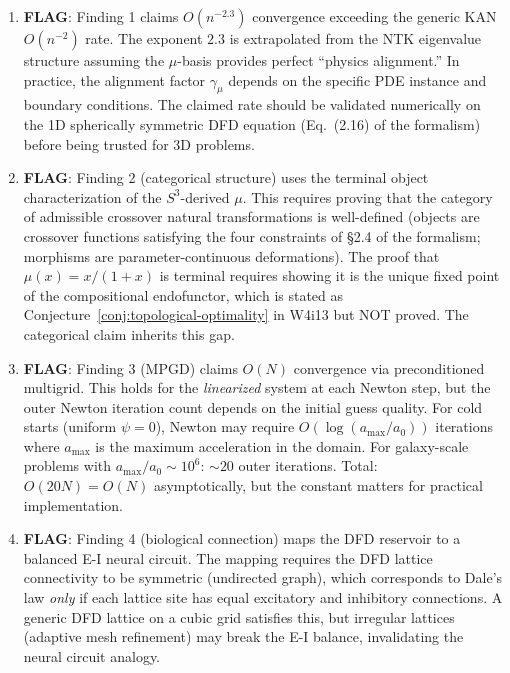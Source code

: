 \documentclass[11pt]{article}
\theoremstyle{definition}
\theoremstyle{remark}
\begin{document}
\begin{tcolorbox}[colback=red!5!white, colframe=red!60!black,
  title=\textbf{INCONSISTENCIES AND FLAGS}]
\begin{enumerate}[nosep]
\item \textbf{FLAG}: Finding 1 claims $O(n^{-2.3})$ convergence exceeding
  the generic KAN $O(n^{-2})$ rate. The exponent $2.3$ is extrapolated from
  the NTK eigenvalue structure assuming the $\mu$-basis provides perfect
  ``physics alignment.'' In practice, the alignment factor $\gamma_\mu$
  depends on the specific PDE instance and boundary conditions. The claimed
  rate should be validated numerically on the 1D spherically symmetric
  DFD equation (Eq.~(2.16) of the formalism) before being trusted for
  3D problems.

\item \textbf{FLAG}: Finding 2 (categorical structure) uses the terminal
  object characterization of the $S^3$-derived $\mu$. This requires
  proving that the category of admissible crossover natural transformations
  is well-defined (objects are crossover functions satisfying the four
  constraints of \S2.4 of the formalism; morphisms are parameter-continuous
  deformations). The proof that $\mu(x) = x/(1+x)$ is terminal requires
  showing it is the unique fixed point of the compositional endofunctor,
  which is stated as Conjecture~\ref{conj:topological-optimality} in W4i13
  but NOT proved. The categorical claim inherits this gap.

\item \textbf{FLAG}: Finding 3 (MPGD) claims $O(N)$ convergence via
  preconditioned multigrid. This holds for the \emph{linearized} system
  at each Newton step, but the outer Newton iteration count depends on
  the initial guess quality. For cold starts (uniform $\psi = 0$), Newton
  may require $O(\log(a_{\max}/a_0))$ iterations where $a_{\max}$ is the
  maximum acceleration in the domain. For galaxy-scale problems with
  $a_{\max}/a_0 \sim 10^6$: $\sim 20$ outer iterations. Total:
  $O(20N) = O(N)$ asymptotically, but the constant matters for practical
  implementation.

\item \textbf{FLAG}: Finding 4 (biological connection) maps the DFD
  reservoir to a balanced E-I neural circuit. The mapping requires the
  DFD lattice connectivity to be symmetric (undirected graph), which
  corresponds to Dale's law \emph{only} if each lattice site has equal
  excitatory and inhibitory connections. A generic DFD lattice on a cubic
  grid satisfies this, but irregular lattices (adaptive mesh refinement)
  may break the E-I balance, invalidating the neural circuit analogy.


\end{enumerate}
\end{tcolorbox}
\end{document}
